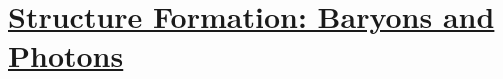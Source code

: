 \section[Structure Formation: Baryons and Photons]{\hyperlink{toc}{Structure Formation: Baryons and Photons}}

\subsection{}
\subsection{}
\subsection{}
\subsection{}